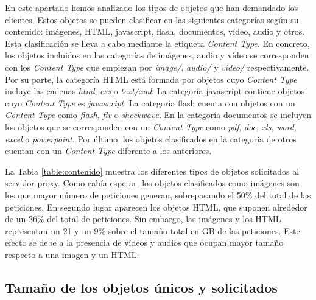 \documentclass[twocolumn]{Jornadas}
\begin{document}
En este apartado hemos analizado los tipos de objetos que han demandado los clientes.
Estos objetos se pueden clasificar en las siguientes categorías según su contenido: imágenes, HTML, javascript, flash, documentos, vídeo, audio y otros.
Esta clasificación se lleva a cabo mediante la etiqueta \emph{Content Type}. En concreto, los objetos incluidos en las categorías de imágenes, audio y vídeo se corresponden con los \emph{Content Type} que empiezan por \textit{image/}, \textit{audio/} y \textit{video/} respectivamente.
Por su parte, la categoría HTML está formada por objetos cuyo \emph{Content Type} incluye las cadenas \textit{html}, \textit{css} o \textit{text/xml}.
La categoría javascript contiene objetos cuyo \emph{Content Type} es \textit{javascript}. La categoría flash cuenta con objetos con un \emph{Content Type} como \textit{flash}, \textit{flv} o \textit{shockwave}. En la categoría documentos se incluyen los objetos que se corresponden con un \emph{Content Type} como \textit{pdf}, \textit{doc}, \textit{xls}, \textit{word}, \textit{excel} o \textit{powerpoint}. Por último, los objetos clasificados en la categoría de otros cuentan con un \emph{Content Type} diferente a los anteriores.

La Tabla \ref{table:contenido} muestra los diferentes tipos de objetos solicitados al servidor proxy. Como cabía esperar, los objetos clasificados como imágenes son los que mayor número de peticiones generan, sobrepasando el 50\% del total de las peticiones. En segundo lugar aparecen los objetos HTML, que suponen alrededor de un 26\% del total de peticiones. Sin embargo, las imágenes y los HTML representan un 21 y un 9\% sobre el tamaño total en GB de las peticiones. Este efecto se debe a la presencia de vídeos y audios que ocupan mayor tamaño respecto a una imagen y un HTML.   

\subsection{Tamaño de los objetos únicos y solicitados}
\label{unicos_solicitados}
\end{document}
